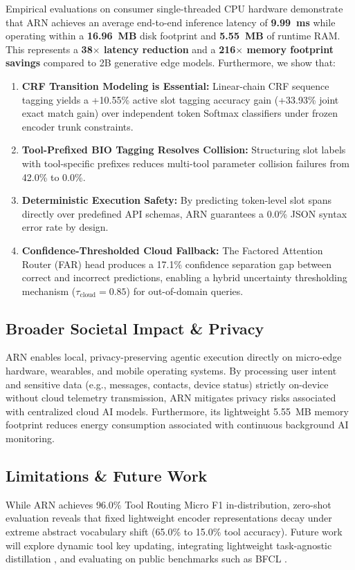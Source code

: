 \documentclass[conference]{IEEEtran}
\begin{document}
Empirical evaluations on consumer single-threaded CPU hardware demonstrate that ARN achieves an average end-to-end inference latency of \textbf{9.99~ms} while operating within a \textbf{16.96~MB} disk footprint and \textbf{5.55~MB} of runtime RAM. This represents a \textbf{38$\times$ latency reduction} and a \textbf{216$\times$ memory footprint savings} compared to 2B generative edge models. Furthermore, we show that:
\begin{enumerate}
    \item \textbf{CRF Transition Modeling is Essential:} Linear-chain CRF sequence tagging yields a +10.55\% active slot tagging accuracy gain (+33.93\% joint exact match gain) over independent token Softmax classifiers under frozen encoder trunk constraints.
    \item \textbf{Tool-Prefixed BIO Tagging Resolves Collision:} Structuring slot labels with tool-specific prefixes reduces multi-tool parameter collision failures from 42.0\% to 0.0\%.
    \item \textbf{Deterministic Execution Safety:} By predicting token-level slot spans directly over predefined API schemas, ARN guarantees a 0.0\% JSON syntax error rate by design.
    \item \textbf{Confidence-Thresholded Cloud Fallback:} The Factored Attention Router (FAR) head produces a 17.1\% confidence separation gap between correct and incorrect predictions, enabling a hybrid uncertainty thresholding mechanism ($\tau_{\text{cloud}} = 0.85$) for out-of-domain queries.
\end{enumerate}

\subsection{Broader Societal Impact \& Privacy}
ARN enables local, privacy-preserving agentic execution directly on micro-edge hardware, wearables, and mobile operating systems. By processing user intent and sensitive data (e.g., messages, contacts, device status) strictly on-device without cloud telemetry transmission, ARN mitigates privacy risks associated with centralized cloud AI models. Furthermore, its lightweight 5.55~MB memory footprint reduces energy consumption associated with continuous background AI monitoring.

\subsection{Limitations \& Future Work}
While ARN achieves 96.0\% Tool Routing Micro F1 in-distribution, zero-shot evaluation reveals that fixed lightweight encoder representations decay under extreme abstract vocabulary shift (65.0\% to 15.0\% tool accuracy). Future work will explore dynamic tool key updating, integrating lightweight task-agnostic distillation \cite{sun2020mobilebert}, and evaluating on public benchmarks such as BFCL \cite{patil2025berkeley}.
\end{document}
